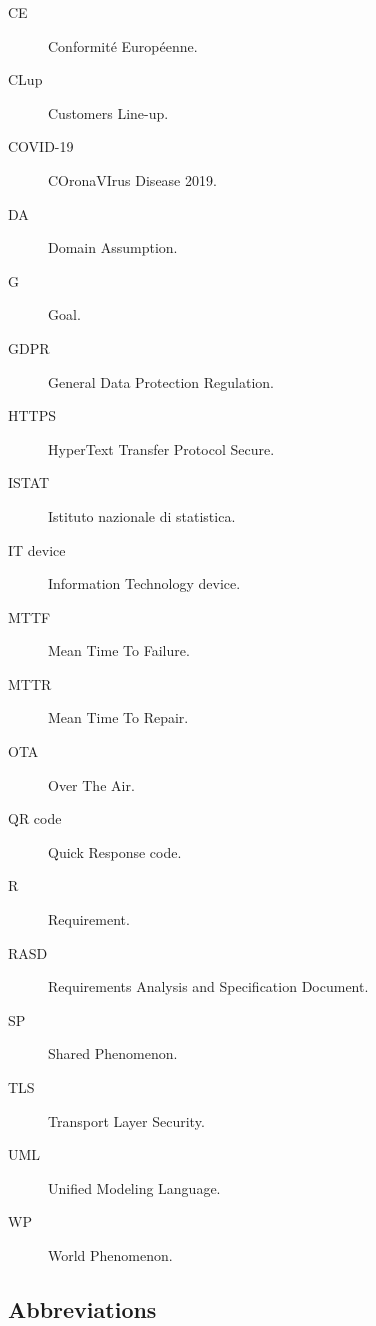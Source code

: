 \documentclass[../../main.tex]{subfiles}
\begin{document}
\begin{description}

    \item[CE] Conformité Européenne.
    
    \item[CLup] Customers Line-up.
    
    \item[COVID-19] COronaVIrus Disease 2019.
    
    \item[DA] Domain Assumption.
    
    \item[G] Goal.
    
    \item[GDPR] General Data Protection Regulation.
    
    \item[HTTPS] HyperText Transfer Protocol Secure.
    
    \item[ISTAT] Istituto nazionale di statistica.
    
    \item[IT device] Information Technology device.

    \item[MTTF] Mean Time To Failure.

    \item[MTTR] Mean Time To Repair.

    \item[OTA] Over The Air.
    
    \item[QR code] Quick Response code.

    \item[R] Requirement. 
    
    \item[RASD] Requirements Analysis and Specification Document.
    
    \item[SP] Shared Phenomenon.

    \item[TLS] Transport Layer Security.
    
    \item[UML] Unified Modeling Language.
    
    \item[WP] World Phenomenon.
\end{description}

\subsection{Abbreviations}
\end{document}

